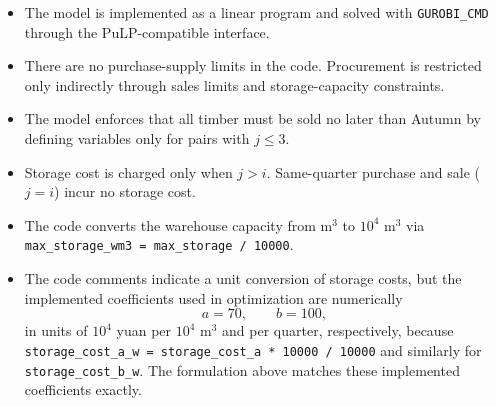 \begin{itemize}
    \item The model is implemented as a linear program and solved with \texttt{GUROBI\_CMD} through the PuLP-compatible interface.
    \item There are no purchase-supply limits in the code. Procurement is restricted only indirectly through sales limits and storage-capacity constraints.
    \item The model enforces that all timber must be sold no later than Autumn by defining variables only for pairs with $j\le 3$.
    \item Storage cost is charged only when $j>i$. Same-quarter purchase and sale ($j=i$) incur no storage cost.
    \item The code converts the warehouse capacity from $\text{m}^3$ to $10^4\text{ m}^3$ via \texttt{max\_storage\_wm3 = max\_storage / 10000}.
    \item The code comments indicate a unit conversion of storage costs, but the implemented coefficients used in optimization are numerically
    \[
    a = 70,\qquad b = 100,
    \]
    in units of $10^4$ yuan per $10^4\text{ m}^3$ and per quarter, respectively, because
    \texttt{storage\_cost\_a\_w = storage\_cost\_a * 10000 / 10000} and similarly for \texttt{storage\_cost\_b\_w}. The formulation above matches these implemented coefficients exactly.
\end{itemize}
